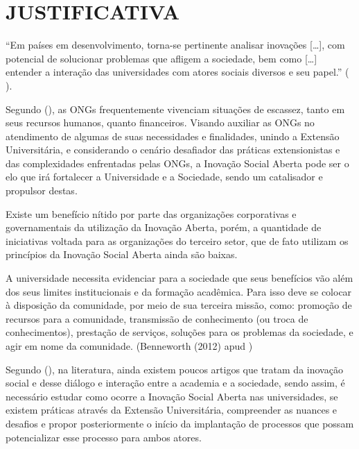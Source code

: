 \section{JUSTIFICATIVA}
\label{justificativa}

“Em países em desenvolvimento, torna-se pertinente analisar inovações […], com potencial de solucionar  problemas que afligem a sociedade, bem como […] entender a  interação das universidades com atores sociais diversos e seu papel.” (\citeauthor{klaumann2023} \citeyear{klaumann2023}).

Segundo \citeauthor{calefato2016} (\citeyear{calefato2016}), as \gls{ONG}s frequentemente vivenciam situações de escassez, tanto em seus recursos humanos, quanto financeiros. Visando auxiliar as \gls{ONG}s no atendimento de algumas de suas necessidades e finalidades, unindo a Extensão Universitária, e considerando o cenário desafiador das práticas extensionistas e das complexidades enfrentadas pelas ONGs, a Inovação Social Aberta pode ser o elo que irá fortalecer a Universidade e a Sociedade, sendo um catalisador e propulsor destas. 

Existe um benefício nítido por parte das organizações corporativas e governamentais da utilização da Inovação Aberta, porém, a quantidade de iniciativas voltada para as organizações do terceiro setor, que de fato utilizam os princípios da Inovação Social Aberta ainda são baixas. \cite{gama2023}

A universidade necessita evidenciar para a sociedade que seus benefícios vão além dos seus limites institucionais e da formação acadêmica. Para isso deve se colocar à disposição da comunidade, por meio de sua terceira missão, como: promoção de recursos para a comunidade, transmissão de conhecimento (ou troca de conhecimentos), prestação de serviços, soluções para os problemas da sociedade, e agir em nome da comunidade. (Benneworth (2012) apud \cite{klaumann2023})

Segundo \citeauthor{klaumann2023} (\citeyear{klaumann2023}), na literatura, ainda existem poucos artigos que tratam da inovação social e desse diálogo e interação entre a academia e a sociedade, sendo assim, é necessário estudar como ocorre a Inovação Social Aberta nas universidades, se existem práticas através da Extensão Universitária, compreender as nuances e desafios e propor posteriormente o início da implantação de processos que possam potencializar esse processo para ambos atores.

